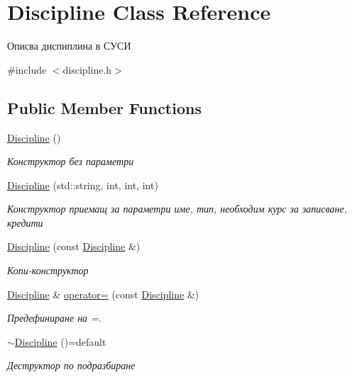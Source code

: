 \hypertarget{class_discipline}{}\section{Discipline Class Reference}
\label{class_discipline}


Описва диспиплина в СУСИ  




{\ttfamily \#include $<$discipline.\+h$>$}

\subsection*{Public Member Functions}
\begin{DoxyCompactItemize}
\item 
\hyperlink{class_discipline_a61b734e60c960dbda6ec72dc804a0b2b}{Discipline} ()
\begin{DoxyCompactList}\small\item\em Конструктор без параметри \end{DoxyCompactList}\item 
\hyperlink{class_discipline_a5f01ef5ac0cbaa3d4481ea4ad86c4688}{Discipline} (std\+::string, int, int, int)
\begin{DoxyCompactList}\small\item\em Конструктор приемащ за параметри име, тип, необходим курс за записване, кредити \end{DoxyCompactList}\item 
\hyperlink{class_discipline_a5053a2810a87a20352ea5fc17a13dad5}{Discipline} (const \hyperlink{class_discipline}{Discipline} \&)
\begin{DoxyCompactList}\small\item\em Копи-\/конструктор \end{DoxyCompactList}\item 
\hyperlink{class_discipline}{Discipline} \& \hyperlink{class_discipline_a7dfde4e359542c96d51abdfd3b82b1d5}{operator=} (const \hyperlink{class_discipline}{Discipline} \&)
\begin{DoxyCompactList}\small\item\em Предефиниране на =. \end{DoxyCompactList}\item 
\hyperlink{class_discipline_a454f8a0a084b1ff964752c288d54032a}{$\sim$\+Discipline} ()=default
\begin{DoxyCompactList}\small\item\em Деструктор по подразбиране \end{DoxyCompactList}\item 

\end{DoxyCompactItemize}
